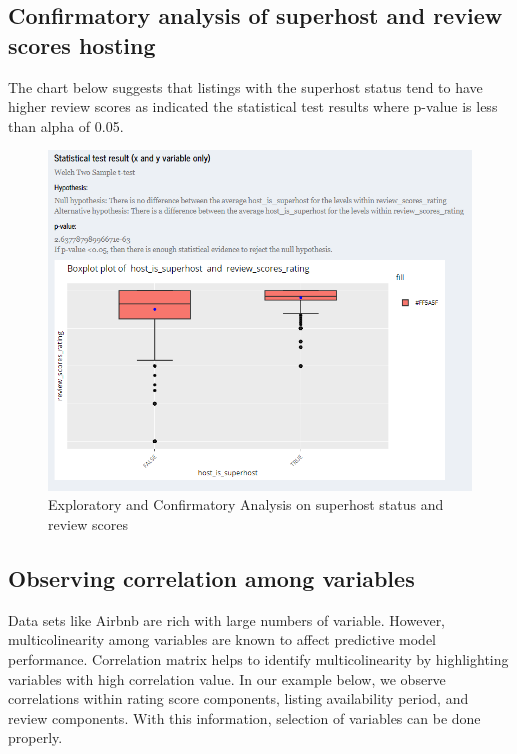 \documentclass{acm_proc_article-sp}
\begin{document}
\hypertarget{confirmatory-analysis-of-superhost-and-review-scores-hosting}{%
\subsection{Confirmatory analysis of superhost and review scores
hosting}\label{confirmatory-analysis-of-superhost-and-review-scores-hosting}}

The chart below suggests that listings with the superhost status tend to
have higher review scores as indicated the statistical test results
where p-value is less than alpha of 0.05.

\begin{figure}[H]

{\centering \includegraphics[width=1\linewidth]{images/usecase_explore4} 

}

\caption{Exploratory and Confirmatory Analysis on superhost status and review scores}\label{fig:unnamed-chunk-19}
\end{figure}

\hypertarget{observing-correlation-among-variables}{%
\subsection{Observing correlation among
variables}\label{observing-correlation-among-variables}}

Data sets like Airbnb are rich with large numbers of variable. However,
multicolinearity among variables are known to affect predictive model
performance. Correlation matrix helps to identify multicolinearity by
highlighting variables with high correlation value. In our example
below, we observe correlations within rating score components, listing
availability period, and review components. With this information,
selection of variables can be done properly.
\end{document}
